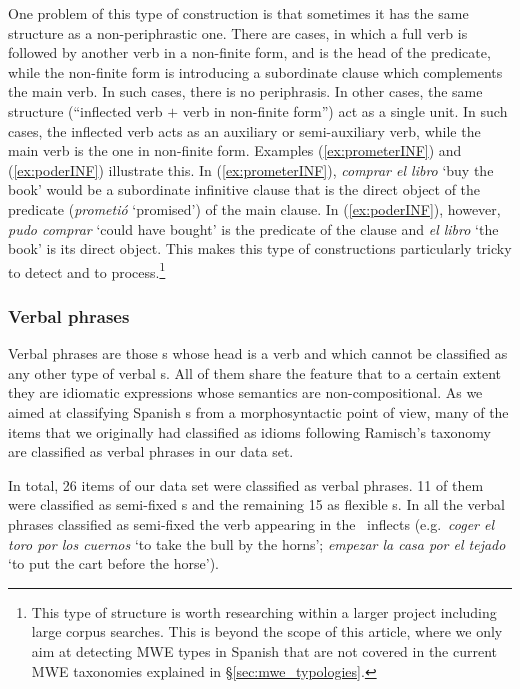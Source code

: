 \documentclass[output=paper]{langsci/langscibook}
\begin{document}
One problem of this type of construction is that sometimes it has the same structure as a non-periphrastic one.
There are cases, in which a full verb is followed by another verb in a non-finite form, and is the head of the predicate, while the non-finite form is introducing a subordinate clause which complements the main verb.
In such cases, there is no periphrasis.
In other cases, the same structure (``inflected verb $+$ verb in non-finite form'') act as a single unit.
In such cases, the inflected verb acts as an auxiliary or semi-auxiliary verb, while the main verb is the one in non-finite form.
Examples (\ref{ex:prometerINF}) and (\ref{ex:poderINF}) illustrate this.
In (\ref{ex:prometerINF}), \textit{comprar el libro} `buy the book' would be a subordinate infinitive clause that is the direct object of the predicate (\textit{prometió} `promised') of the main clause.
In (\ref{ex:poderINF}), however, \textit{pudo comprar} `could have bought' is the predicate of the clause and \textit{el libro} `the book' is its direct object.
This makes this type of constructions particularly tricky to detect and to process.\footnote{This type of structure is worth researching within a larger project including large corpus searches. This is beyond the scope of this article, where we only aim at detecting MWE types in Spanish that are not covered in the current MWE taxonomies explained in §\ref{sec:mwe_typologies}.}

\subsubsection{Verbal phrases}
\label{ssec:verbal-phrases}

Verbal phrases are those \mwe s whose head is a verb and which cannot be classified as any other type of verbal \mwe s.
All of them share the feature that to a certain extent they are idiomatic expressions whose semantics are non-compositional. 
As we aimed at classifying Spanish \mwe s from a morphosyntactic point of view, many of the items that we originally had classified as idioms following Ramisch's taxonomy \citeyearpar{Ramisch:2012,Ramisch:2015} are classified as verbal phrases in our data set.

In total, 26 items of our data set were classified as verbal phrases.
11 of them were classified as semi-fixed \mwe s and the remaining 15 as flexible \mwe s.
In all the verbal phrases classified as semi-fixed the verb appearing in the \mwe\ inflects (e.g.\  \textit{coger el toro por los cuernos} `to take the bull by the horns'; \textit{empezar la casa por el tejado} `to put the cart before the horse'). 
\end{document}
